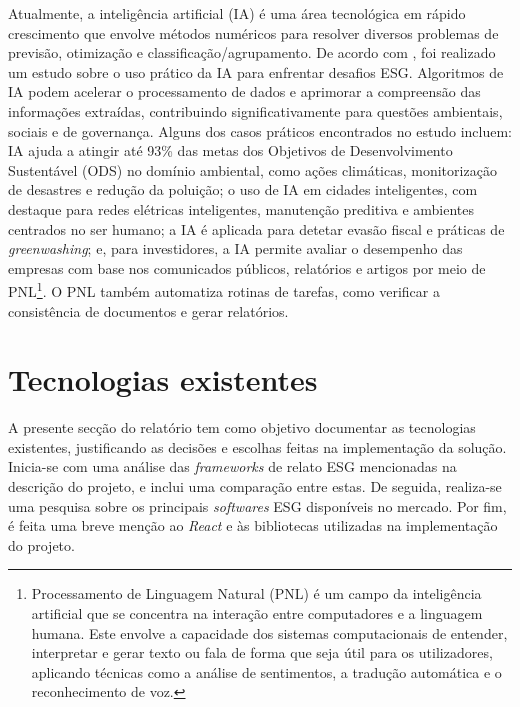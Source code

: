 Atualmente, a inteligência artificial (IA) é uma área tecnológica em rápido crescimento que envolve métodos numéricos para resolver diversos problemas de previsão, otimização e classificação/agrupamento. De acordo com \cite{Burnaev2023}, foi realizado um estudo sobre o uso prático da IA para enfrentar desafios ESG. Algoritmos de IA podem acelerar o processamento de dados e aprimorar a compreensão das informações extraídas, contribuindo significativamente para questões ambientais, sociais e de governança. Alguns dos casos práticos encontrados no estudo incluem: IA ajuda a atingir até 93\% das metas dos Objetivos de Desenvolvimento Sustentável (ODS) no domínio ambiental, como ações climáticas, monitorização de desastres e redução da poluição; o uso de IA em cidades inteligentes, com destaque para redes elétricas inteligentes, manutenção preditiva e ambientes centrados no ser humano; a IA é aplicada para detetar evasão fiscal e práticas de \textit{greenwashing}; e, para investidores, a IA permite avaliar o desempenho das empresas com base nos comunicados públicos, relatórios e artigos por meio de \gls{PNL}\footnote{Processamento de Linguagem Natural (PNL) é um campo da inteligência artificial que se concentra na interação entre computadores e a linguagem humana. Este envolve a capacidade dos sistemas computacionais de entender, interpretar e gerar texto ou fala de forma que seja útil para os utilizadores, aplicando técnicas como a análise de sentimentos, a tradução automática e o reconhecimento de voz.}. O PNL também automatiza rotinas de tarefas, como verificar a consistência de documentos e gerar relatórios.


\section{Tecnologias existentes} 
\label{sec:TechExist}

A presente secção do relatório tem como objetivo documentar as tecnologias existentes, justificando as decisões e escolhas feitas na implementação da solução. Inicia-se com uma análise das \textit{frameworks} de relato ESG mencionadas na descrição do projeto, e inclui uma comparação entre estas. De seguida, realiza-se uma pesquisa sobre os principais \textit{softwares} ESG disponíveis no mercado. Por fim, é feita uma breve menção ao \textit{React} e às bibliotecas utilizadas na implementação do projeto.

